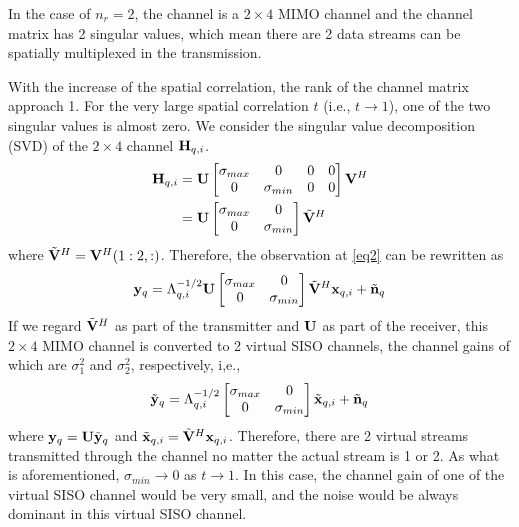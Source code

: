 \documentclass[10pt,conference]{IEEEtran}
\begin{document}

In the case of $n_r=2$, the channel is a $2 \times 4$ MIMO channel and the channel
matrix has 2 singular values, which mean there are 2 data streams can be spatially 
multiplexed in the transmission.

With the increase of the spatial correlation, the rank of the channel matrix approach 
1. For the very large spatial correlation $t$ (i.e., $t \to 1$), one of the two singular values
is almost zero. We consider the singular value decomposition (SVD) of the $2 \times 4$
channel ${\bf{H}}_{q,i}$.
\begin{align}
    {\bf{H}}_{q,i} & = {\bf{U}} \left[\begin{matrix} \sigma_{max}&0&0&0 \\ 0&\sigma_{min}&0&0 \end{matrix}\right] {\bf{V}}^H \nonumber \\
    & = {\bf{U}} \left[\begin{matrix} \sigma_{max}&0 \\ 0&\sigma_{min} \end{matrix}\right] \tilde{{\bf{V}}}^H
\end{align}
where $\tilde{{\bf{V}}}^H = {\bf{V}}^H(1:2,:)$. Therefore, the observation at \eqref{eq2} can be rewritten as
\begin{equation}
    {\bf{y}}_{q} = \Lambda_{q,i}^{-1/2} {\bf{U}} \left[\begin{matrix} \sigma_{max}&0 \\ 0&\sigma_{min} \end{matrix}\right] \tilde{{\bf{V}}}^H {\bf{x}}_{q,i} + \tilde{{\bf{n}}}_{q} 
\end{equation}
If we regard $\tilde{{\bf{V}}}^H$ as part of the transmitter and ${\bf{U}}$ as part of the 
receiver, this $2 \times 4$ MIMO channel is converted to 2 virtual SISO channels, the channel gains
of which are $\sigma_1^2$ and $\sigma_2^2$, respectively, i,e.,
\begin{equation}
    \tilde{{\bf{y}}}_q = \Lambda_{q,i}^{-1/2} \left[\begin{matrix} \sigma_{max}&0 \\ 0&\sigma_{min} \end{matrix}\right] \tilde{{\bf{x}}}_{q,i} + \tilde{{\bf{n}}}_{q} 
\end{equation}
where ${\bf{y}}_q = {\bf{U}} \tilde{{\bf{y}}}_q$ and $\tilde{{\bf{x}}}_{q,i} = \tilde{\bf{V}}^H {\bf{x}}_{q,i}$.
Therefore, there are 2 virtual streams transmitted through the channel no matter the actual 
stream is 1 or 2. As what is aforementioned, $\sigma_{min} \to 0$ as 
$t \to 1$. In this case, the channel gain of one of the virtual SISO channel would be very small, and the noise would be always 
dominant in this virtual SISO channel. 
\end{document}

